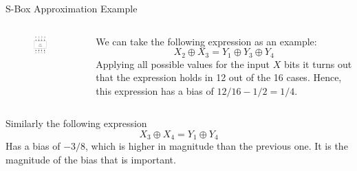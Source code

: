 \documentclass[9pt]{beamer}
\begin{document}
\begin{frame}
S-Box Approximation Example

\vspace{5mm}
\begin{columns}
\begin{column}{0.3\textwidth}
\begin{figure}
\includegraphics[width=0.7\textwidth]{spn_sbox_unkeyed.jpg}
\end{figure}
\end{column}

\begin{column}{0.7\textwidth}
We can take the following expression as an example:
\[ X_2 \oplus X_3 = Y_1 \oplus Y_3 \oplus Y_4 \]
\pause Applying all possible values for the input $X$ bits it turns out that the expression holds in 12 out of the 16 cases. \pause Hence, this expression has a bias of $12/16 - 1/2 = 1/4$.
\end{column}
\end{columns}

\vspace{5mm}
\pause Similarly the following expression
\[ X_3 \oplus X_4 = Y_1 \oplus Y_4 \]
Has a bias of $-3/8$, which is higher in magnitude than the previous one. \pause It is the magnitude of the bias that is important.
\end{frame}
\end{document}
